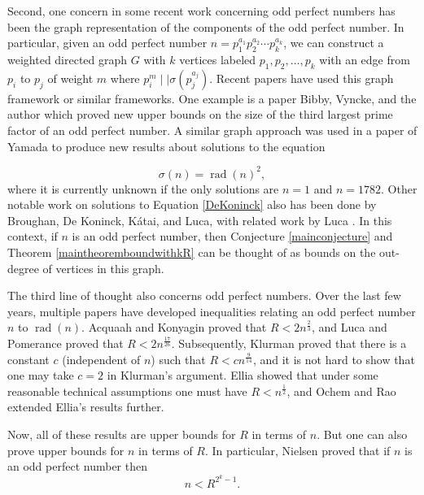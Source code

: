 \documentclass[12pt,reqno]{article}
\theoremstyle{plain}
\theoremstyle{definition}
\theoremstyle{remark}
\DeclareMathOperator{\rad}{rad}
\begin{document}
Second, one concern in some recent work concerning odd perfect numbers has been the graph representation of the components of the odd perfect number. In particular, given an odd perfect number $n =p_1^{a_1}p_2^{a_2} \cdots p_k^{a_k}$, we can construct a weighted directed graph $G$ with $k$ vertices labeled $p_1, p_2, \ldots, p_k$ with an edge from $p_i$ to $p_j$ of weight $m$ where $p_i^{m} \mid \mid \sigma(p_j^{a_j})$. Recent papers have used this graph framework or similar frameworks.  One example is a paper Bibby, Vyncke, and the author \cite{BVZ}  which proved new upper bounds on the size of the third largest prime factor of an odd perfect number. A similar graph approach was used in a paper of Yamada \cite{Yamada2}  to produce new results about solutions to the equation 

\begin{equation} \sigma(n) = \rad(n)^2 \label{DeKoninck}, \end{equation}
where it is currently unknown if the only solutions are $n=1$ and $n=1782$. Other notable work on solutions to Equation \eqref{DeKoninck} also has been done by Broughan, De Koninck, K\'{a}tai, and Luca, \cite{BKKL} with related work by Luca \cite{Luca}. In this context, if $n$ is an odd perfect number, then Conjecture \ref{mainconjecture} and Theorem \ref{maintheoremboundwithkR} can be thought of as bounds on the out-degree of vertices in this graph. 

The third line of thought also concerns odd perfect numbers. Over the last few years, multiple papers have developed inequalities relating an odd perfect number $n$ to $\rad(n)$. Acquaah and Konyagin \cite{AcquaahKonyagin} proved that $R < 2n^\frac{2}{3}$, and Luca and Pomerance \cite{LucaPomerance} proved that $R < 2n^\frac{17}{26}$. Subsequently, Klurman \cite{Klurman} proved that there is a constant $c$ (independent of $n$) such that $R < cn^\frac{9}{14}$, and it is not hard to show that one may take $c=2$ in Klurman's argument. Ellia \cite{Ellia} showed that under some reasonable technical assumptions one must have $R < n^\frac{1}{2}$, and Ochem and Rao \cite{OchemRaoradica} extended Ellia's results further. 

Now, all of these results are upper bounds for $R$ in terms of $n$. But one can also prove upper bounds for $n$ in terms of $R$. In particular, Nielsen \cite{Nielsen} proved that if $n$ is an odd perfect number then 
\begin{equation}
    n < R^{2^k-1} \label{Nielsenupperbound}.
\end{equation}
\end{document}
